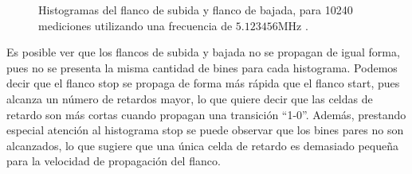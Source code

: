 \begin{figure}[H]
\begin{subfigure}{0.45\textwidth}
{           }
     \end{subfigure}
     \caption{Histogramas del flanco de subida y flanco de bajada, para 10240 mediciones
     utilizando una frecuencia de $5.123456$MHz .}
     \label{fig: histogramas_magic}
\end{figure}%

Es posible ver que los flancos de subida y bajada no se propagan de igual forma, pues no se presenta
la misma cantidad de bines para cada histograma. Podemos decir que el flanco stop se propaga de forma más
rápida que el flanco start, pues alcanza un número de retardos mayor, 
lo que quiere decir que las celdas de retardo son más cortas cuando propagan una transición ``1-0''.
Además, prestando especial atención al histograma stop se puede observar que los bines pares no son alcanzados,
lo que sugiere que una única celda de retardo es demasiado pequeña para la velocidad de propagación del flanco.\\


